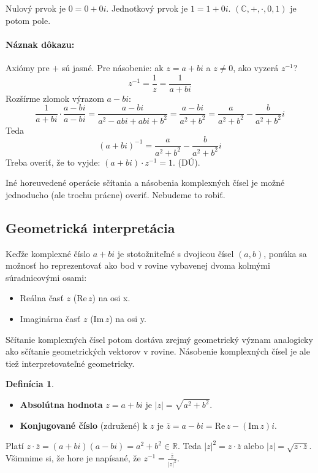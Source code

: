 \documentclass[11pt,a4paper]{article}
\theoremstyle{definition}
\newtheorem{definicia}{Definícia}[section]
\theoremstyle{plain}
\theoremstyle{remark}
\newcommand{\R}{\mathbb{R}}
\begin{document}
Nulový prvok je $0 = 0 + 0i$. Jednotkový prvok je $1 = 1 + 0i$.
$( \mathbb{C}, +, \cdot, 0, 1 )$ je potom pole.

\paragraph{Náznak dôkazu:} Axiómy pre $+$ sú jasné. Pre násobenie: ak $z = a+bi$ a $z \neq 0$, ako vyzerá $z^{-1}$?
$$ z^{-1} = \frac{1}{z} = \frac{1}{a+bi} $$
Rozšírme zlomok výrazom $a-bi$:
$$ \frac{1}{a+bi} \cdot \frac{a-bi}{a-bi} = \frac{a-bi}{a^2 - abi + abi + b^2} = \frac{a-bi}{a^2+b^2} = \frac{a}{a^2+b^2} - \frac{b}{a^2+b^2}i $$
Teda
$$ (a+bi)^{-1} = \frac{a}{a^2+b^2} - \frac{b}{a^2+b^2}i $$
Treba overiť, že to vyjde: $(a+bi) \cdot z^{-1} = 1$. (DÚ).

Iné horeuvedené operácie sčítania a násobenia komplexných čísel je možné jednoducho (ale trochu prácne) overiť. Nebudeme to robiť.

\subsection*{Geometrická interpretácia}
Keďže komplexné číslo $a+bi$ je stotožniteľné s dvojicou čísel $(a,b)$, ponúka sa možnosť ho reprezentovať ako bod v rovine vybavenej dvoma kolmými súradnicovými osami:
\begin{itemize}
    \item Reálna časť $z$ ($\mathrm{Re}\, z$) na osi x.
    \item Imaginárna časť $z$ ($\mathrm{Im}\, z$) na osi y.
\end{itemize}

Sčítanie komplexných čísel potom dostáva zrejmý geometrický význam analogicky ako sčítanie geometrických vektorov v rovine.
Násobenie komplexných čísel je ale tiež interpretovateľné geometricky.

\begin{definicia}
\begin{itemize}
    \item \textbf{Absolútna hodnota} $z = a+bi$ je $|z| = \sqrt{a^2+b^2}$.
    \item \textbf{Konjugované číslo} (združené) k $z$ je $\overline{z} = a-bi = \mathrm{Re}\, z - (\mathrm{Im}\, z)i$.
\end{itemize}
\end{definicia}

Platí $z \cdot \overline{z} = (a+bi)(a-bi) = a^2+b^2 \in \R$. Teda $|z|^2 = z \cdot \overline{z}$ alebo $|z| = \sqrt{z \cdot \overline{z}}$.
Všimnime si, že hore je napísané, že $z^{-1} = \frac{\overline{z}}{|z|^2}$.
\end{document}
